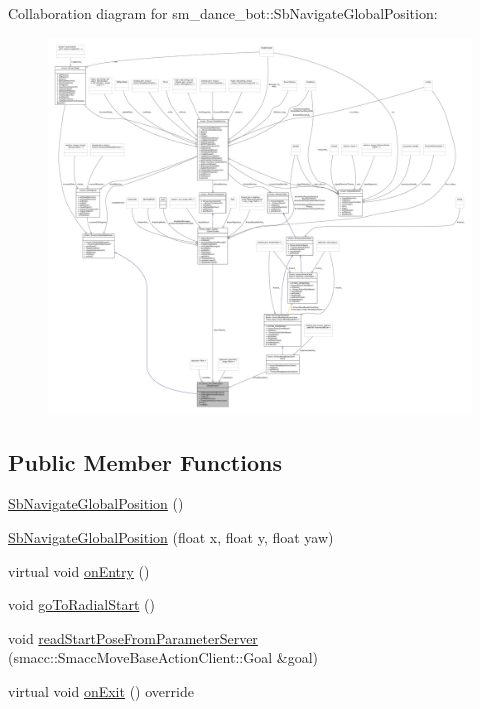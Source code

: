 Collaboration diagram for sm\+\_\+dance\+\_\+bot\+:\+:Sb\+Navigate\+Global\+Position\+:
\nopagebreak
\begin{figure}[H]
\begin{center}
\leavevmode
\includegraphics[width=350pt]{classsm__dance__bot_1_1SbNavigateGlobalPosition__coll__graph}
\end{center}
\end{figure}
\subsection*{Public Member Functions}
\begin{DoxyCompactItemize}
\item 
\hyperlink{classsm__dance__bot_1_1SbNavigateGlobalPosition_ac4672a223ba8b08995de3968468e0976}{Sb\+Navigate\+Global\+Position} ()
\item 
\hyperlink{classsm__dance__bot_1_1SbNavigateGlobalPosition_affbfb51797db8cd073765bc2f6050194}{Sb\+Navigate\+Global\+Position} (float x, float y, float yaw)
\item 
virtual void \hyperlink{classsm__dance__bot_1_1SbNavigateGlobalPosition_af5bbe5fa0319ba2f8e5e3cbd40527a43}{on\+Entry} ()
\item 
void \hyperlink{classsm__dance__bot_1_1SbNavigateGlobalPosition_ab923d1e3c346506417d18f0ebbfd33ec}{go\+To\+Radial\+Start} ()
\item 
void \hyperlink{classsm__dance__bot_1_1SbNavigateGlobalPosition_adc268e278b7de844202959036f424a91}{read\+Start\+Pose\+From\+Parameter\+Server} (smacc\+::\+Smacc\+Move\+Base\+Action\+Client\+::\+Goal \&goal)
\item 
virtual void \hyperlink{classsm__dance__bot_1_1SbNavigateGlobalPosition_a7120a2dd1f6e53558b0c70ec6b02a804}{on\+Exit} () override
\end{DoxyCompactItemize}

